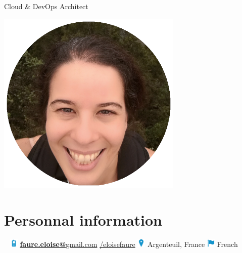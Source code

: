 \documentclass[]{friggeri-cv}
\begin{document}
	
		 {\qquad Cloud \& DevOps Architect  }
      

\begin{aside}
  \includegraphics[scale=0.36]{img/eloise.png}
  ~
  ~
  \section{Personnal information}
  ~    
 \ifdefined\PhoneNumber %
 {\includegraphics[width=0.4cm]{img/mobile_icon.pdf}} \textbf{ \PhoneNumber }  \vspace{6pt} 
  \fi %
  \href{mailto:faure.eloise@gmail.com}{\textbf{faure.eloise@}gmail.com} \vspace{-4pt}
%
  \href{https://fr.linkedin.com/in/eloisefaure}{ /eloisefaure} \vspace{7pt}
%
{\includegraphics[width=0.4cm]{img/localisation.png}}  Argenteuil, France \vspace{6pt}
%
{\includegraphics[width=0.4cm]{img/nationality.png}}    \enspace French 
~
~

\end{aside}
\end{document}
